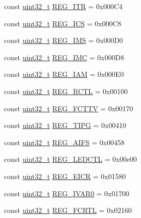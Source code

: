 \begin{DoxyCompactItemize}
\item 
const \hyperlink{Type_8hh_a435d1572bf3f880d55459d9805097f62}{uint32\_\-t} \hyperlink{namespaceiGbReg_ac96a5f971fc136ea2bcd3aebbff561c4}{REG\_\-ITR} = 0x000C4
\item 
const \hyperlink{Type_8hh_a435d1572bf3f880d55459d9805097f62}{uint32\_\-t} \hyperlink{namespaceiGbReg_a97f7e3206e6b84e95085a5b08b4d937c}{REG\_\-ICS} = 0x000C8
\item 
const \hyperlink{Type_8hh_a435d1572bf3f880d55459d9805097f62}{uint32\_\-t} \hyperlink{namespaceiGbReg_afed6fab07c4f60999dfbe0e3baf80dca}{REG\_\-IMS} = 0x000D0
\item 
const \hyperlink{Type_8hh_a435d1572bf3f880d55459d9805097f62}{uint32\_\-t} \hyperlink{namespaceiGbReg_ab04ba4481c50d2448a63080c40c33a43}{REG\_\-IMC} = 0x000D8
\item 
const \hyperlink{Type_8hh_a435d1572bf3f880d55459d9805097f62}{uint32\_\-t} \hyperlink{namespaceiGbReg_a4c6f0da1f8268af5106cbb06a399afc0}{REG\_\-IAM} = 0x000E0
\item 
const \hyperlink{Type_8hh_a435d1572bf3f880d55459d9805097f62}{uint32\_\-t} \hyperlink{namespaceiGbReg_a9b7b0830333db7d62d77d4baab8628cb}{REG\_\-RCTL} = 0x00100
\item 
const \hyperlink{Type_8hh_a435d1572bf3f880d55459d9805097f62}{uint32\_\-t} \hyperlink{namespaceiGbReg_aa36baad1c52cf734cd536d65a54602a8}{REG\_\-FCTTV} = 0x00170
\item 
const \hyperlink{Type_8hh_a435d1572bf3f880d55459d9805097f62}{uint32\_\-t} \hyperlink{namespaceiGbReg_a533e7ea17bb2e80603d2da871d8ee499}{REG\_\-TIPG} = 0x00410
\item 
const \hyperlink{Type_8hh_a435d1572bf3f880d55459d9805097f62}{uint32\_\-t} \hyperlink{namespaceiGbReg_a1c508b3181f153a1e8e98a6866906cd8}{REG\_\-AIFS} = 0x00458
\item 
const \hyperlink{Type_8hh_a435d1572bf3f880d55459d9805097f62}{uint32\_\-t} \hyperlink{namespaceiGbReg_a15c1307f1e65e489f3ca5fb75212d71d}{REG\_\-LEDCTL} = 0x00e00
\item 
const \hyperlink{Type_8hh_a435d1572bf3f880d55459d9805097f62}{uint32\_\-t} \hyperlink{namespaceiGbReg_a96b0b26da65a0436503fc82ab3cf9ad3}{REG\_\-EICR} = 0x01580
\item 
const \hyperlink{Type_8hh_a435d1572bf3f880d55459d9805097f62}{uint32\_\-t} \hyperlink{namespaceiGbReg_aebdef83062f3325649e7ef6bf35b4e9d}{REG\_\-IVAR0} = 0x01700
\item 
const \hyperlink{Type_8hh_a435d1572bf3f880d55459d9805097f62}{uint32\_\-t} \hyperlink{namespaceiGbReg_a101890cb2355a85cf060a07aeef60d89}{REG\_\-FCRTL} = 0x02160

\end{DoxyCompactItemize}
